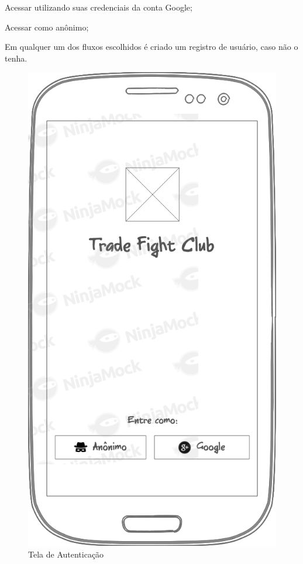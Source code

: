 \begin{lista}
  \item Acessar utilizando suas credenciais da conta Google;
  \item Acessar como anônimo;
\end{lista}

Em qualquer um dos fluxos escolhidos é criado um registro de usuário, caso não o tenha.

\begin{figure}[H]
  \caption{\label{fig:mock_login}Tela de Autenticação}
  \centering
  \includegraphics[scale=0.4]{imagens/mocks/login.png}
\end{figure}

